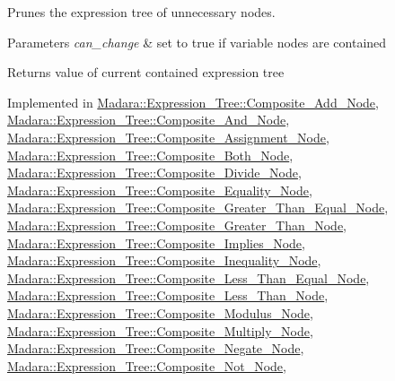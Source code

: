 Prunes the expression tree of unnecessary nodes. 


\begin{DoxyParams}{Parameters}
{\em can\_\-change} & set to true if variable nodes are contained \\
\hline
\end{DoxyParams}
\begin{DoxyReturn}{Returns}
value of current contained expression tree 
\end{DoxyReturn}


Implemented in \hyperlink{classMadara_1_1Expression__Tree_1_1Composite__Add__Node_a40ec621d31e38a5fdefa7445e5378227}{Madara::Expression\_\-Tree::Composite\_\-Add\_\-Node}, \hyperlink{classMadara_1_1Expression__Tree_1_1Composite__And__Node_aebd287766ca5e720db29446b60c1b9b6}{Madara::Expression\_\-Tree::Composite\_\-And\_\-Node}, \hyperlink{classMadara_1_1Expression__Tree_1_1Composite__Assignment__Node_a58aad88460f030c8a58b365c211a2504}{Madara::Expression\_\-Tree::Composite\_\-Assignment\_\-Node}, \hyperlink{classMadara_1_1Expression__Tree_1_1Composite__Both__Node_a9ffef2b8c0f5fc025ffc9ddd04f65844}{Madara::Expression\_\-Tree::Composite\_\-Both\_\-Node}, \hyperlink{classMadara_1_1Expression__Tree_1_1Composite__Divide__Node_a8cfb96a567df6afb30935d27c92cdcca}{Madara::Expression\_\-Tree::Composite\_\-Divide\_\-Node}, \hyperlink{classMadara_1_1Expression__Tree_1_1Composite__Equality__Node_a91847a47177176e3c90a66a0af26e702}{Madara::Expression\_\-Tree::Composite\_\-Equality\_\-Node}, \hyperlink{classMadara_1_1Expression__Tree_1_1Composite__Greater__Than__Equal__Node_a9833f0ed0c051ea406b1a67e987f2b2e}{Madara::Expression\_\-Tree::Composite\_\-Greater\_\-Than\_\-Equal\_\-Node}, \hyperlink{classMadara_1_1Expression__Tree_1_1Composite__Greater__Than__Node_a0c392aaaa2c3d420284ed932eebabf0d}{Madara::Expression\_\-Tree::Composite\_\-Greater\_\-Than\_\-Node}, \hyperlink{classMadara_1_1Expression__Tree_1_1Composite__Implies__Node_a1619d68eb2db2be8aeed73811c775909}{Madara::Expression\_\-Tree::Composite\_\-Implies\_\-Node}, \hyperlink{classMadara_1_1Expression__Tree_1_1Composite__Inequality__Node_a69b643ade2a33e1c67bb0061898c5eab}{Madara::Expression\_\-Tree::Composite\_\-Inequality\_\-Node}, \hyperlink{classMadara_1_1Expression__Tree_1_1Composite__Less__Than__Equal__Node_a429febd1284c14f39a49ebf5406bba1e}{Madara::Expression\_\-Tree::Composite\_\-Less\_\-Than\_\-Equal\_\-Node}, \hyperlink{classMadara_1_1Expression__Tree_1_1Composite__Less__Than__Node_a351204dc5331c772933a725e367a1fe5}{Madara::Expression\_\-Tree::Composite\_\-Less\_\-Than\_\-Node}, \hyperlink{classMadara_1_1Expression__Tree_1_1Composite__Modulus__Node_a1762f6a31a60425c6f99070af3e5d815}{Madara::Expression\_\-Tree::Composite\_\-Modulus\_\-Node}, \hyperlink{classMadara_1_1Expression__Tree_1_1Composite__Multiply__Node_ab01ac436816d007000456fc3962241b8}{Madara::Expression\_\-Tree::Composite\_\-Multiply\_\-Node}, \hyperlink{classMadara_1_1Expression__Tree_1_1Composite__Negate__Node_ad1cf0eb41e1b962483cd07a6cffa49cf}{Madara::Expression\_\-Tree::Composite\_\-Negate\_\-Node}, \hyperlink{classMadara_1_1Expression__Tree_1_1Composite__Not__Node_ad6cca9a480df314dd71006bfa2dfd96e}{Madara::Expression\_\-Tree::Composite\_\-Not\_\-Node}, 